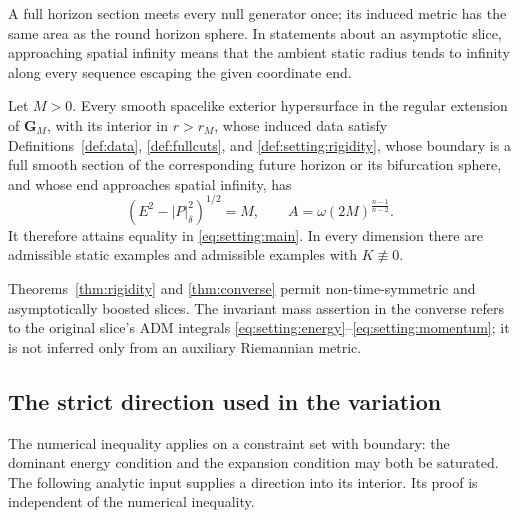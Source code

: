 A full horizon section meets every null generator once; its induced
metric has the same area as the round horizon sphere. In statements
about an asymptotic slice, approaching spatial infinity means that
the ambient static radius tends to infinity along every sequence
escaping the given coordinate end.

\begin{theorem}
\label{thm:converse}
Let \(M>0\). Every smooth spacelike exterior hypersurface in the regular
extension of \(\mathbf G_M\), with its interior in \(r>r_M\), whose
induced data satisfy
Definitions~\ref{def:data}, \ref{def:fullcuts}, and
\ref{def:setting:rigidity}, whose boundary is a full smooth section
of the corresponding future horizon or its bifurcation sphere,
and whose end approaches spatial infinity, has
\begin{equation}
 (E^2-|P|_\delta^2)^{1/2}=M,\qquad
 A=\omega(2M)^{\frac{n-1}{n-2}}.
 \label{eq:setting:converse}
\end{equation}
It therefore attains equality in \eqref{eq:setting:main}.
In every dimension there are admissible static examples and
admissible examples with \(K\not\equiv0\).
\end{theorem}

Theorems~\ref{thm:rigidity} and \ref{thm:converse} permit
non-time-symmetric and asymptotically boosted slices. The invariant
mass assertion in the converse refers to the original slice's ADM
integrals \eqref{eq:setting:energy}--\eqref{eq:setting:momentum};
it is not inferred only from an auxiliary Riemannian metric.


\subsection{The strict direction used in the variation}

The numerical inequality applies on a constraint set with boundary:
the dominant energy condition and the expansion condition may both be
saturated. The following analytic input supplies a direction into its
interior. Its proof is independent of the numerical inequality.

